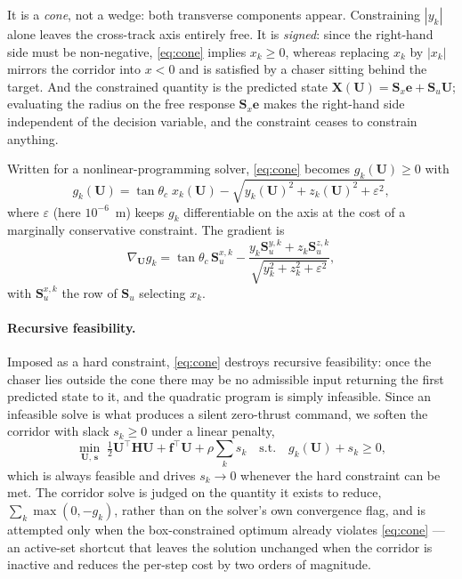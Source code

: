 It is a \emph{cone}, not a wedge: both transverse components appear.
Constraining $|y_k|$ alone leaves the cross-track axis entirely free. It is
\emph{signed}: since the right-hand side must be non-negative,
\eqref{eq:cone} implies $x_k \ge 0$, whereas replacing $x_k$ by $|x_k|$
mirrors the corridor into $x < 0$ and is satisfied by a chaser sitting behind
the target. And the constrained quantity is the predicted state
$\mathbf{X}(\mathbf{U}) = \mathbf{S}_x \mathbf{e} + \mathbf{S}_u \mathbf{U}$;
evaluating the radius on the free response $\mathbf{S}_x\mathbf{e}$ makes the
right-hand side independent of the decision variable, and the constraint
ceases to constrain anything.

Written for a nonlinear-programming solver, \eqref{eq:cone} becomes
$g_k(\mathbf{U}) \ge 0$ with
\begin{equation}
g_k(\mathbf{U}) = \tan\theta_c \; x_k(\mathbf{U})
   - \sqrt{y_k(\mathbf{U})^2 + z_k(\mathbf{U})^2 + \varepsilon^2},
\label{eq:cone_g}
\end{equation}
where $\varepsilon$ (here $10^{-6}$~m) keeps $g_k$ differentiable on the axis
at the cost of a marginally conservative constraint. The gradient is
\begin{equation}
\nabla_{\mathbf{U}} g_k = \tan\theta_c \, \mathbf{S}_u^{x,k}
 - \frac{y_k \mathbf{S}_u^{y,k} + z_k \mathbf{S}_u^{z,k}}
        {\sqrt{y_k^2 + z_k^2 + \varepsilon^2}} ,
\label{eq:cone_grad}
\end{equation}
with $\mathbf{S}_u^{x,k}$ the row of $\mathbf{S}_u$ selecting $x_k$.

\paragraph{Recursive feasibility.}
Imposed as a hard constraint, \eqref{eq:cone} destroys recursive feasibility:
once the chaser lies outside the cone there may be no admissible input
returning the first predicted state to it, and the quadratic program is simply
infeasible. Since an infeasible solve is what produces a silent
zero-thrust command, we soften the corridor with slack
$s_k \ge 0$ under a linear penalty,
\begin{equation}
\min_{\mathbf{U},\,\mathbf{s}} \;
\tfrac{1}{2}\mathbf{U}^{\top}\mathbf{H}\mathbf{U} + \mathbf{f}^{\top}\mathbf{U}
+ \rho \sum_{k} s_k
\quad \text{s.t.} \quad g_k(\mathbf{U}) + s_k \ge 0 ,
\label{eq:cone_soft}
\end{equation}
which is always feasible and drives $s_k \to 0$ whenever the hard constraint
can be met. The corridor solve is judged on the quantity it exists to reduce,
$\sum_k \max(0, -g_k)$, rather than on the solver's own convergence flag, and
is attempted only when the box-constrained optimum already violates
\eqref{eq:cone} --- an active-set shortcut that leaves the solution unchanged
when the corridor is inactive and reduces the per-step cost by two orders of
magnitude.
